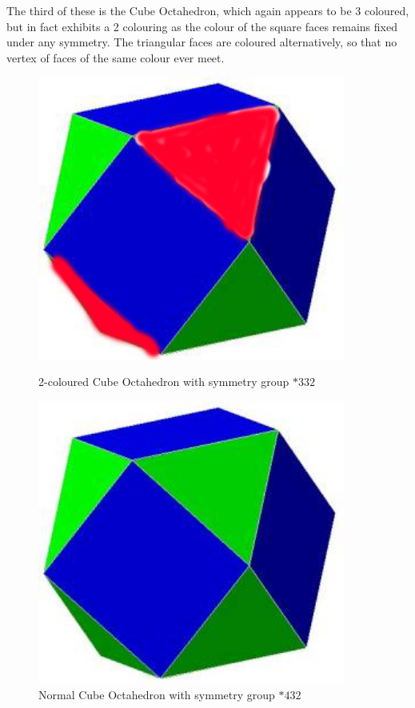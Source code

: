 \documentclass{article}
\begin{document}
\begin{figure}[htbp]
\begin{minipage}{0.3\textwidth}
    \end{minipage}
\end{figure}

The third of these is the Cube Octahedron, which again appears to be 3 coloured, but in fact exhibits a 2 colouring as the colour of the square faces remains fixed under any symmetry. The triangular faces are coloured alternatively, so that no vertex of faces of the same colour ever meet.

\begin{figure}[htbp]
    \centering
    \begin{minipage}{0.3\textwidth}
        \centering
        \includegraphics[width=0.9\textwidth]{Cube Octahedron.png}
        \caption{2-coloured Cube Octahedron with symmetry group $*332$}
        
    \end{minipage}\hfill
    \begin{minipage}{0.3\textwidth}
        \centering
        \includegraphics[width=0.9\textwidth]{Normal Cube Octahedron.jpg} 
        \caption{Normal Cube Octahedron with symmetry group $*432$}
       

\end{minipage}
\end{figure}
\end{document}
